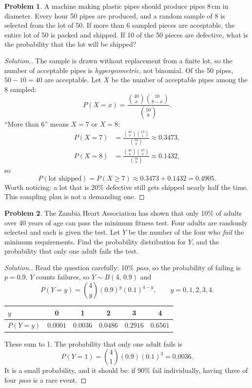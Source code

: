 \documentclass[12pt,a4paper]{report}
\theoremstyle{definition}
\theoremstyle{plain}
\theoremstyle{definition}
\newtheorem{problemx}{Problem}[section]
\newenvironment{problem}{\begin{problemx}}{\end{problemx}}
\newenvironment{solution}
  {\renewcommand{\qedsymbol}{}\begin{proof}[\textit{Solution}.]}
  {\end{proof}}
\begin{document}
\begin{problem}
A machine making plastic pipes should produce pipes 8\,cm in diameter. Every hour 50 pipes
are produced, and a random sample of 8 is selected from the lot of 50. If more than 6
sampled pieces are acceptable, the entire lot of 50 is packed and shipped. If 10 of the 50
pieces are defective, what is the probability that the lot will be shipped?
\end{problem}

\begin{solution}
The sample is drawn without replacement from a finite lot, so the number of acceptable
pipes is \emph{hypergeometric}, not binomial. Of the 50 pipes, $50-10 = 40$ are
acceptable. Let $X$ be the number of acceptable pipes among the 8 sampled:
\[P(X=x) = \frac{\binom{40}{x}\binom{10}{8-x}}{\binom{50}{8}}.\]
``More than 6'' means $X = 7$ or $X = 8$:
\begin{align*}
P(X=7) &= \frac{\binom{40}{7}\binom{10}{1}}{\binom{50}{8}} \approx 0.3473,\\
P(X=8) &= \frac{\binom{40}{8}\binom{10}{0}}{\binom{50}{8}} \approx 0.1432,
\end{align*}
so
\[P(\text{lot shipped}) = P(X\geq 7) \approx 0.3473+0.1432 = 0.4905.\]
Worth noticing: a lot that is 20\% defective still gets shipped nearly half the time. This
sampling plan is not a demanding one.
\end{solution}

\begin{problem}
The Zambia Heart Association has shown that only 10\% of adults over 40 years of age can
pass the minimum fitness test. Four adults are randomly selected and each is given the
test. Let $Y$ be the number of the four who \emph{fail} the minimum requirements. Find the
probability distribution for $Y$, and the probability that only one adult fails the test.
\end{problem}

\begin{solution}
Read the question carefully: 10\% \emph{pass}, so the probability of failing is
$p = 0.9$. $Y$ counts failures, so $Y\sim B(4,\,0.9)$ and
\[P(Y=y) = \binom{4}{y}(0.9)^{y}(0.1)^{4-y}, \qquad y = 0,1,2,3,4.\]
\begin{table}[H]
\centering
\begin{tabular}{lccccc}
$y$      & 0 & 1 & 2 & 3 & 4\\
\hline
$P(Y=y)$ & $0.0001$ & $0.0036$ & $0.0486$ & $0.2916$ & $0.6561$\\
\end{tabular}
\end{table}
These sum to 1. The probability that only one adult fails is
\[P(Y=1) = \binom{4}{1}(0.9)(0.1)^{3} = 0.0036.\]
It is a small probability, and it should be: if 90\% fail individually, having three of
four \emph{pass} is a rare event.
\end{solution}
\end{document}
